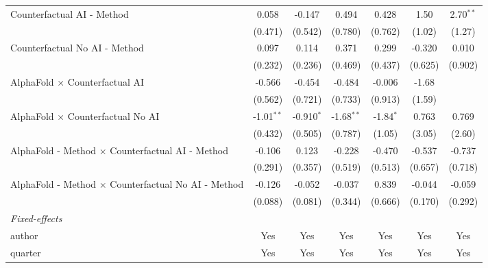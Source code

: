 \begin{tabular}{lcccccc}
   Counterfactual AI - Method                                 & 0.058         & -0.147        & 0.494        & 0.428       & 1.50    & 2.70$^{**}$\\   
                                                              & (0.471)       & (0.542)       & (0.780)      & (0.762)     & (1.02)  & (1.27)\\   
   Counterfactual No AI - Method                              & 0.097         & 0.114         & 0.371        & 0.299       & -0.320  & 0.010\\   
                                                              & (0.232)       & (0.236)       & (0.469)      & (0.437)     & (0.625) & (0.902)\\   
   AlphaFold $\times$ Counterfactual AI                       & -0.566        & -0.454        & -0.484       & -0.006      & -1.68   &   \\   
                                                              & (0.562)       & (0.721)       & (0.733)      & (0.913)     & (1.59)  &   \\   
   AlphaFold $\times$ Counterfactual No AI                    & -1.01$^{**}$  & -0.910$^{*}$  & -1.68$^{**}$ & -1.84$^{*}$ & 0.763   & 0.769\\   
                                                              & (0.432)       & (0.505)       & (0.787)      & (1.05)      & (3.05)  & (2.60)\\   
   AlphaFold - Method $\times$ Counterfactual AI - Method     & -0.106        & 0.123         & -0.228       & -0.470      & -0.537  & -0.737\\   
                                                              & (0.291)       & (0.357)       & (0.519)      & (0.513)     & (0.657) & (0.718)\\   
   AlphaFold - Method $\times$ Counterfactual No AI - Method  & -0.126        & -0.052        & -0.037       & 0.839       & -0.044  & -0.059\\   
                                                              & (0.088)       & (0.081)       & (0.344)      & (0.666)     & (0.170) & (0.292)\\   
   \midrule
   \emph{Fixed-effects}\\
   author                                                     & Yes           & Yes           & Yes          & Yes         & Yes     & Yes\\  
   quarter                                                    & Yes           & Yes           & Yes          & Yes         & Yes     & Yes\\  

\end{tabular}
